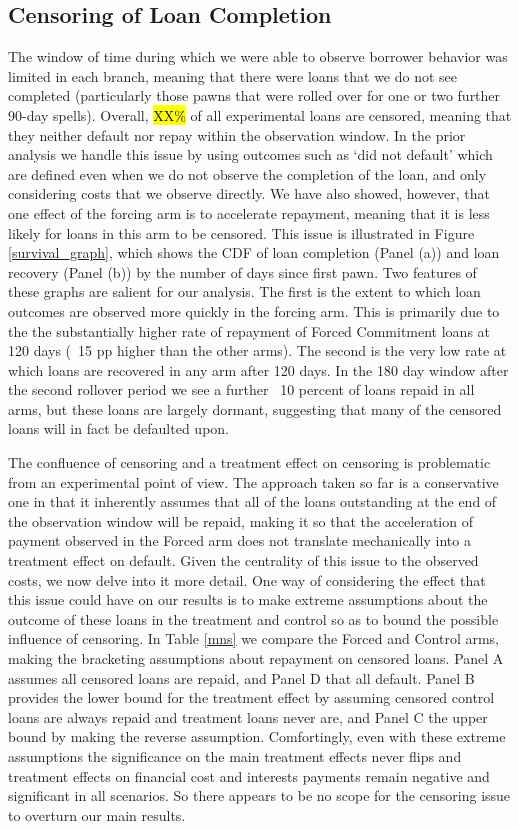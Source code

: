 \documentclass[oneside,11pt]{article}
\begin{document}
\subsection{Censoring of Loan Completion}

The window of time during which we were able to observe borrower behavior was limited in each branch, meaning that there were loans that we do not see completed (particularly those pawns that were rolled over for one or two further 90-day spells).  Overall, \hl{XX\%} of all experimental loans are censored, meaning that they neither default nor repay within the observation window.  In the prior analysis we handle this issue by using outcomes such as `did not default' which are defined even when we do not observe the completion of the loan, and only considering costs that we observe directly.  We have also showed, however, that one effect of the forcing arm is to accelerate repayment, meaning that it is less likely for loans in this arm to be censored.  This issue is illustrated in Figure \ref{survival_graph}, which shows the CDF of loan completion (Panel (a)) and loan recovery (Panel (b)) by the number of days since first pawn.  Two features of these graphs are salient for our analysis.  The first is the extent to which loan outcomes are observed more quickly in the forcing arm.  This is primarily due to the the substantially higher rate of repayment of Forced Commitment loans at 120 days (~15 pp higher than the other arms).  The second is the very low rate at which loans are recovered in any arm after 120 days.  In the 180 day window after the second rollover period we see a further ~10 percent of loans repaid in all arms, but these loans are largely dormant, suggesting that many of the censored loans will in fact be defaulted upon.

The confluence of censoring and a treatment effect on censoring is problematic from an experimental point of view.  The approach taken so far is a conservative one in that it inherently assumes that all of the loans outstanding at the end of the observation window will be repaid, making it so that the acceleration of payment observed in the Forced arm does not translate mechanically into a treatment effect on default.  Given the centrality of this issue to the observed costs, we now delve into it more detail.  One way of considering the effect that this issue could have on our results is to make extreme assumptions about the outcome of these loans in the treatment and control so as to bound the possible influence of censoring.  In Table \ref{mns} we compare the Forced and Control arms, making the bracketing assumptions about repayment on censored loans.  Panel A assumes all censored loans are repaid, and Panel D that all default.  Panel B provides the lower bound for the treatment effect by assuming censored control loans are always repaid and treatment loans never are, and Panel C the upper bound by making the reverse assumption.  Comfortingly, even with these extreme assumptions the significance on the main treatment effects never flips and treatment effects on financial cost and interests payments remain negative and significant in all scenarios.  So there appears to be no scope for the censoring issue to overturn our main results. 
\end{document}
